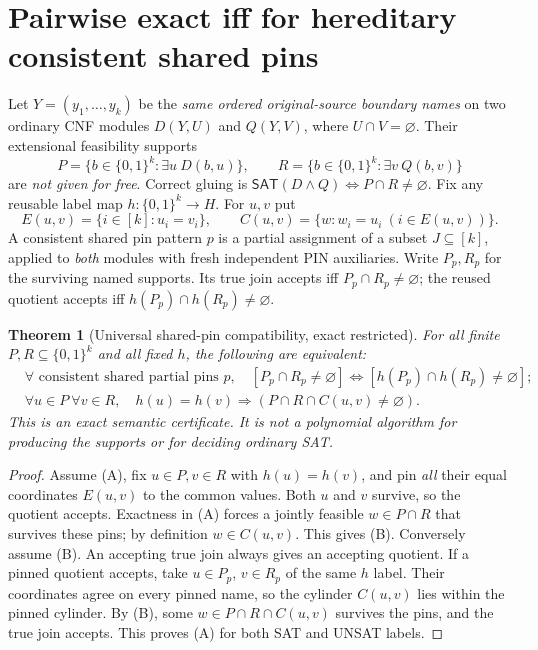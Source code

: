 \documentclass[11pt]{article}
\newtheorem{theorem}{Theorem}
\newcommand{\SAT}{\mathsf{SAT}}
\begin{document}
\section{Pairwise exact iff for hereditary consistent shared pins}
Let $Y=(y_1,\ldots,y_k)$ be the \emph{same ordered original-source
boundary names} on two ordinary CNF modules $D(Y,U)$ and $Q(Y,V)$,
where $U\cap V=\varnothing$. Their extensional feasibility supports
\[
 P=\{b\in\{0,1\}^k:\exists u\ D(b,u)\},
 \qquad
 R=\{b\in\{0,1\}^k:\exists v\ Q(b,v)\}
\]
are \emph{not given for free}. Correct gluing is
$\SAT(D\wedge Q)\iff P\cap R\ne\varnothing$.
Fix any reusable label map $h:\{0,1\}^k\to H$.
For $u,v$ put
\[
 E(u,v)=\{i\in[k]:u_i=v_i\},\qquad
 C(u,v)=\{w:w_i=u_i\ (i\in E(u,v))\}.
\]
A consistent shared pin pattern $p$ is a partial assignment of
a subset $J\subseteq[k]$, applied to \emph{both} modules with
fresh independent PIN auxiliaries. Write $P_p,R_p$ for the surviving
named supports. Its true join accepts iff $P_p\cap R_p\ne\varnothing$;
the reused quotient accepts iff
$h(P_p)\cap h(R_p)\ne\varnothing$.

\begin{theorem}[Universal shared-pin compatibility, exact restricted]
For all finite $P,R\subseteq\{0,1\}^k$ and all fixed $h$, the following
are equivalent:
\[
 \begin{split}
 &\forall\text{ consistent shared partial pins }p,\quad
 [P_p\cap R_p\ne\varnothing]
 \Longleftrightarrow
 [h(P_p)\cap h(R_p)\ne\varnothing];\tag{A}\\
 &\forall u\in P\ \forall v\in R,\quad
 h(u)=h(v)\Longrightarrow
 (P\cap R\cap C(u,v)\ne\varnothing).\tag{B}
 \end{split}
\]
This is an exact \emph{semantic} certificate. It is not a polynomial
algorithm for producing the supports or for deciding ordinary SAT.
\end{theorem}
\begin{proof}
Assume (A), fix $u\in P,v\in R$ with $h(u)=h(v)$, and pin
\emph{all} their equal coordinates $E(u,v)$ to the common values.
Both $u$ and $v$ survive, so the quotient accepts. Exactness in
(A) forces a jointly feasible $w\in P\cap R$ that survives these
pins; by definition $w\in C(u,v)$. This gives (B).
Conversely assume (B). An accepting true join always gives an
accepting quotient. If a pinned quotient accepts, take
$u\in P_p$, $v\in R_p$ of the same $h$ label. Their coordinates
agree on every pinned name, so the cylinder $C(u,v)$ lies within
the pinned cylinder. By (B), some $w\in P\cap R\cap C(u,v)$
survives the pins, and the true join accepts. This proves (A)
for both SAT and UNSAT labels.
\end{proof}
\end{document}
